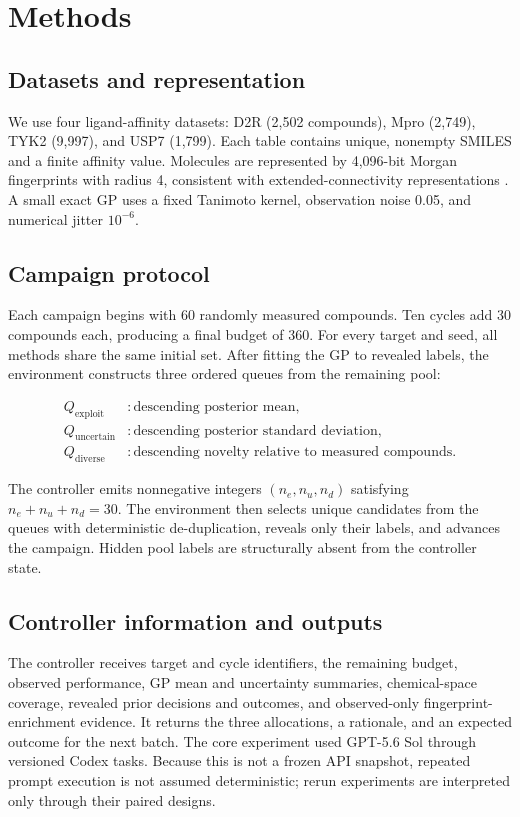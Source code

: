\documentclass{article}
\begin{document}
\section{Methods}

\subsection{Datasets and representation}

We use four ligand-affinity datasets: D2R (2,502 compounds), Mpro (2,749), TYK2 (9,997), and USP7 (1,799). Each table contains unique, nonempty SMILES and a finite affinity value. Molecules are represented by 4,096-bit Morgan fingerprints with radius 4, consistent with extended-connectivity representations \citep{rogers2010ecfp}. A small exact GP uses a fixed Tanimoto kernel, observation noise 0.05, and numerical jitter $10^{-6}$.

\subsection{Campaign protocol}

Each campaign begins with 60 randomly measured compounds. Ten cycles add 30 compounds each, producing a final budget of 360. For every target and seed, all methods share the same initial set. After fitting the GP to revealed labels, the environment constructs three ordered queues from the remaining pool:

\begin{align}
Q_{\mathrm{exploit}} &: \text{descending posterior mean}, \\
Q_{\mathrm{uncertain}} &: \text{descending posterior standard deviation}, \\
Q_{\mathrm{diverse}} &: \text{descending novelty relative to measured compounds}.
\end{align}

The controller emits nonnegative integers $(n_e,n_u,n_d)$ satisfying $n_e+n_u+n_d=30$. The environment then selects unique candidates from the queues with deterministic de-duplication, reveals only their labels, and advances the campaign. Hidden pool labels are structurally absent from the controller state.

\subsection{Controller information and outputs}

The controller receives target and cycle identifiers, the remaining budget, observed performance, GP mean and uncertainty summaries, chemical-space coverage, revealed prior decisions and outcomes, and observed-only fingerprint-enrichment evidence. It returns the three allocations, a rationale, and an expected outcome for the next batch. The core experiment used GPT-5.6 Sol through versioned Codex tasks. Because this is not a frozen API snapshot, repeated prompt execution is not assumed deterministic; rerun experiments are interpreted only through their paired designs.
\end{document}
